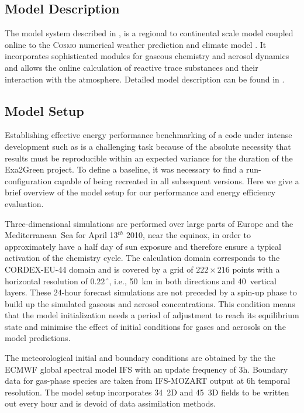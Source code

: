 \subsection{Model Description}
\label{subsec:1.1}

The  model  system  \cosmoart  described in  \cite{Vogel-2009},  is  a
regional   to  continental   scale   model  coupled   online  to   the
\textsc{Cosmo}   numerical  weather   prediction  and   climate  model
\cite{Baldauf-2011}.    It  incorporates  sophisticated   modules  for
gaseous  chemistry   and  aerosol  dynamics  and   allows  the  online
calculation of  reactive trace  substances and their  interaction with
the  atmosphere.    Detailed  model   description  can  be   found  in
\cite{Bangert-2012, Knote-2011, Knote-2013}.

\subsection{Model Setup}
\label{subsec:1.2}

Establishing effective energy performance benchmarking of a code under
intense development such as \cosmoart is a challenging task because of
the  absolute necessity that  results must  be reproducible  within an
expected variance  for the duration of the  Exa2Green pro\-je\-ct.  To
define  a  baseline, it  was  necessary  to  find a  run-configuration
capable of being recreated in all subsequent versions.  Here we give a
brief  overview of  the model  setup  for our  performance and  energy
efficiency evaluation.

Three-dimensional simulations are performed over large parts of Europe
and the Mediterranean~Sea for  April 13$^{th}$ 2010, near the equinox,
in  order  to  approximately have  a  half  day  of sun  exposure  and
therefore  ensure a typical  activation of  the chemistry  cycle.  The
calculation  domain  corresponds to  the  CORDEX-EU-44  domain and  is
covered  by  a  grid  of  $222\times 216$  points  with  a  horizontal
resolution  of $0.22\,^{\circ}$,  i.e., 50~km  in both  directions and
40~vertical  layers.   These  24-hour  forecast  simulations  are  not
preceded  by a spin-up  phase to  build up  the simulated  gaseous and
aerosol   concentrations.   This  condition   means  that   the  model
initialization needs  a period of adjustment to  reach its equilibrium
state  and minimise  the effect  of initial  conditions for  gases and
aerosols on the model predictions.

The meteorological initial and boundary conditions are obtained by the
the ECMWF  global spectral model IFS  with an update  frequency of 3h.
Boundary data  for gas-phase species are taken  from IFS-MOZART output
at  6h temporal resolution.   The model  setup incorporates  34~2D and
45~3D  fields to  be written  out  every hour  and is  devoid of  data
assimilation methods.

